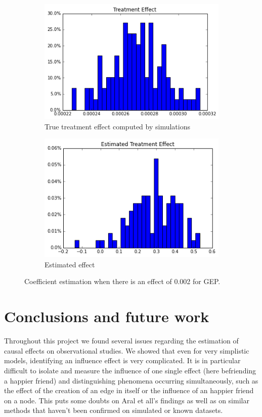 \documentclass[11pt]{article}
\begin{document}
\begin{figure}[h]
\centering
\begin{subfigure}{.5\textwidth}
  \centering
  \includegraphics[width=.9\linewidth]{treatment_effect_no_influence.png}
  \caption{True treatment effect computed by simulations}
  \label{fig:sub1}
\end{subfigure}%
\begin{subfigure}{.5\textwidth}
  \centering
  \includegraphics[width=.9\linewidth]{estimated_large_effect_gep.png}
  \caption{Estimated effect}
  \label{fig:sub2}
\end{subfigure}
\caption{Coefficient estimation when there is an effect of 0.002 for GEP.}
\label{fig:large_effect_gep}
\end{figure}

\FloatBarrier
\section{Conclusions and future work}
Throughout this project we found several issues regarding the estimation of causal effects on observational studies. We showed that even for very simplistic models, identifying an influence effect is very complicated. It is in particular difficult to isolate and measure the influence of one single effect (here befriending a happier friend) and distinguishing phenomena occurring simultaneously, such as the effect of the creation of an edge in itself or the influence of an happier friend on a node. This puts some doubts on Aral et all’s findings as well as on similar methods that haven’t been confirmed on simulated or known datasets. \\
\end{document}
